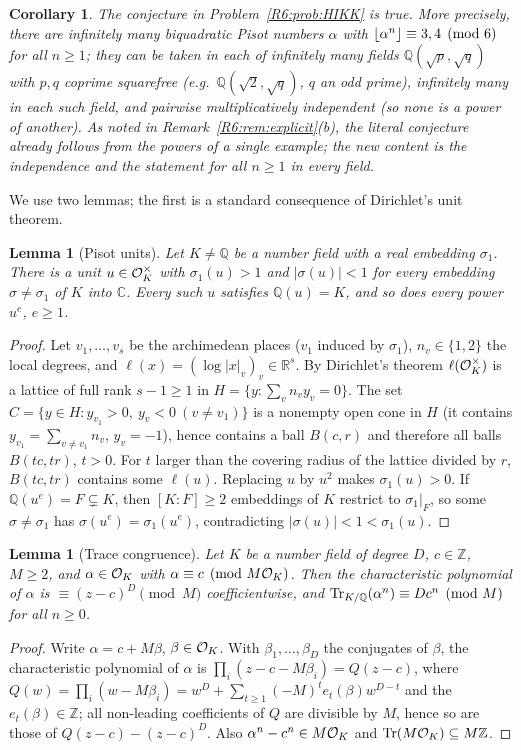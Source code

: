 \documentclass[11pt]{amsart}
\newtheorem{lemma}[theorem]{Lemma}
\newtheorem{corollary}[theorem]{Corollary}
\theoremstyle{definition}
\theoremstyle{remark}
\providecommand{\C}{\mathbb C}
\providecommand{\R}{\mathbb R}
\providecommand{\Q}{\mathbb Q}
\providecommand{\Z}{\mathbb Z}
\begin{document}
\begin{corollary}\label{R6:cor:HIKK}
The conjecture in Problem~\ref{R6:prob:HIKK} is true. More precisely, there are infinitely many
biquadratic Pisot numbers $\alpha$ with $\left\lfloor \alpha^n\right\rfloor\equiv 3,4\pmod 6$ for \emph{all} $n\ge1$;
they can be taken in each of infinitely many fields $\Q(\sqrt p,\sqrt q)$ with $p,q$ coprime
squarefree (e.g.\ $\Q(\sqrt 2,\sqrt q)$, $q$ an odd prime), infinitely many in each such field, and
pairwise multiplicatively independent (so none is a power of another). As noted in
Remark~\ref{R6:rem:explicit}(b), the literal conjecture already follows from the powers of a single
example; the new content is the independence and the statement for all $n\ge1$ in every field.
\end{corollary}

We use two lemmas; the first is a standard consequence of Dirichlet's unit theorem.

\begin{lemma}[Pisot units]\label{R6:lem:pisotunit}
Let $K\neq\Q$ be a number field with a real embedding $\sigma_1$. There is a unit $u\in\mathcal{O}_K^\times$
with $\sigma_1(u)>1$ and $|\sigma(u)|<1$ for every embedding $\sigma\ne\sigma_1$ of $K$ into $\C$.
Every such $u$ satisfies $\Q(u)=K$, and so does every power $u^e$, $e\ge1$.
\end{lemma}
\begin{proof}
Let $v_1,\dots,v_s$ be the archimedean places ($v_1$ induced by $\sigma_1$), $n_v\in\{1,2\}$ the local
degrees, and $\ell(x)=(\log|x|_{v})_v\in\R^s$. By Dirichlet's theorem $\ell(\mathcal{O}_K^\times)$ is a lattice
of full rank $s-1\ge1$ in $H=\{y:\sum_v n_vy_v=0\}$. The set
$C=\{y\in H: y_{v_1}>0,\ y_v<0\ (v\ne v_1)\}$ is a nonempty open cone in $H$ (it contains
$y_{v_1}=\sum_{v\ne v_1}n_v$, $y_v=-1$), hence contains a ball $B(c,r)$ and therefore all balls
$B(tc,tr)$, $t>0$. For $t$ larger than the covering radius of the lattice divided by $r$, $B(tc,tr)$
contains some $\ell(u)$. Replacing $u$ by $u^2$ makes $\sigma_1(u)>0$. If $\Q(u^e)=F\subsetneq K$,
then $[K:F]\ge2$ embeddings of $K$ restrict to $\sigma_1|_F$, so some $\sigma\ne\sigma_1$ has
$\sigma(u^e)=\sigma_1(u^e)$, contradicting $|\sigma(u)|<1<\sigma_1(u)$.
\end{proof}

\begin{lemma}[Trace congruence]\label{R6:lem:trace}
Let $K$ be a number field of degree $D$, $c\in\Z$, $M\ge 2$, and $\alpha\in\mathcal{O}_K$ with
$\alpha\equiv c\pmod{M\mathcal{O}_K}$. Then the characteristic polynomial of $\alpha$ is
$\equiv(z-c)^D\pmod M$ coefficientwise, and $\Tr_{K/\Q}(\alpha^n)\equiv Dc^n\pmod M$ for all
$n\ge0$.
\end{lemma}
\begin{proof}
Write $\alpha=c+M\beta$, $\beta\in\mathcal{O}_K$. With $\beta_1,\dots,\beta_D$ the conjugates of $\beta$,
the characteristic polynomial of $\alpha$ is $\prod_i(z-c-M\beta_i)=Q(z-c)$, where
$Q(w)=\prod_i(w-M\beta_i)=w^D+\sum_{t\ge1}(-M)^te_t(\beta)w^{D-t}$ and the $e_t(\beta)\in\Z$; all
non-leading coefficients of $Q$ are divisible by $M$, hence so are those of $Q(z-c)-(z-c)^D$.
Also $\alpha^n-c^n\in M\mathcal{O}_K$ and $\Tr(M\OO_K)\subseteq M\Z$.
\end{proof}
\end{document}

